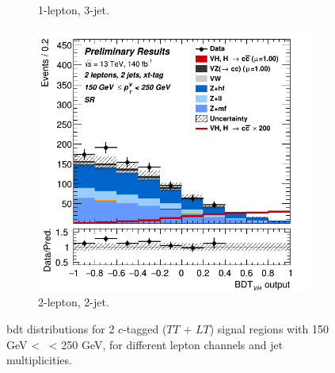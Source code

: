 \begin{figure}[h!]
\begin{subfigure}[b]{0.32\textwidth}
      \caption{1-lepton, 3-jet.}
      \label{fig:plots_VHcc_ex_1L_SR_2C}
  \end{subfigure}
  \begin{subfigure}[b]{0.32\textwidth}
    \centering
    \includegraphics[width=\textwidth]{Images/VH/Own_fit/prefit_VHcc/Region_distmva_BMax250_BMin150_DSR_J2_TTypext_T2_L2_Y6051_Prefit.png}
    \caption{2-lepton, 2-jet.}
    \label{fig:plots_VHcc_ex_2L_SR_2C}
\end{subfigure}
  \caption{\gls{bdt} distributions for 2 $c$-tagged ($TT$ + $LT$) signal regions with 150 GeV < \ptv\ < 250 GeV, for different lepton channels and jet multiplicities.}
  \label{fig:plots_VHcc_ex_SR_2C}
\end{figure} 


